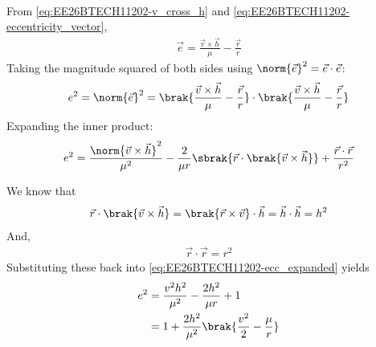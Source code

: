 \begin{enumerate}[label=\thesubsection.\arabic*, ref=\thesubsection.\theenumi]
\begin{align}
\end{align}
\solution
From \eqref{eq:EE26BTECH11202-v_cross_h} and \eqref{eq:EE26BTECH11202-eccentricity_vector},
\begin{align}
\vec{e} = \frac{\vec{v} \times \vec{h}}{\mu} - \frac{\vec{r}}{r}
\end{align}
Taking the magnitude squared of both sides using $\norm{\vec{e}}^2 = \vec{e} \cdot \vec{e}$:
\begin{align}
e^2 = \norm{\vec{e}}^2 = \brak{\frac{\vec{v} \times \vec{h}}{\mu} - \frac{\vec{r}}{r}} \cdot \brak{\frac{\vec{v} \times \vec{h}}{\mu} - \frac{\vec{r}}{r}}
\end{align}
Expanding the inner product:
\begin{align}
e^2 = \frac{\norm{\vec{v} \times \vec{h}}^2}{\mu^2} - \frac{2}{\mu r} \sbrak{\vec{r} \cdot \brak{\vec{v} \times \vec{h}}} + \frac{\vec{r} \cdot \vec{r}}{r^2}
\label{eq:EE26BTECH11202-ecc_expanded}
\end{align}

We know that
\begin{align}
\vec{r} \cdot \brak{\vec{v} \times \vec{h}} = \brak{\vec{r} \times \vec{v}} \cdot \vec{h} = \vec{h} \cdot \vec{h} = h^2
\end{align}
And,
\begin{align}
\vec{r} \cdot \vec{r} = r^2
\end{align}
Substituting these back into \eqref{eq:EE26BTECH11202-ecc_expanded} yields
\begin{align}
e^2 &= \frac{v^2 h^2}{\mu^2} - \frac{2 h^2}{\mu r} + 1 
\\
&= 1 + \frac{2 h^2}{\mu^2} \brak{\frac{v^2}{2} - \frac{\mu}{r}}
\label{eq:EE26BTECH11202-ecc_energy_sub}
\end{align}


\end{enumerate}
